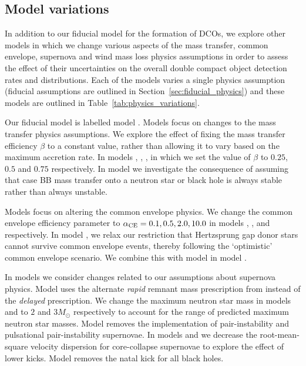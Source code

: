 \subsection{Model variations} \label{sec:variation_assumptions}
In addition to our fiducial model for the formation of DCOs, we explore \nMinusOneModels{} other models in which we change various aspects of the mass transfer, common envelope, supernova and wind mass loss physics assumptions in order to assess the effect of their uncertainties on the overall double compact object detection rates and distributions. Each of the models varies a single physics assumption (fiducial assumptions are outlined in Section~\ref{sec:fiducial_physics}) and these models are outlined in Table~\ref{tab:physics_variations}.

Our fiducial model is labelled model \modFid{}. Models \modRangeMT{} focus on changes to the mass transfer physics assumptions. We explore the effect of fixing the mass transfer efficiency $\beta$ to a constant value, rather than allowing it to vary based on the maximum accretion rate. In models \modBetaLow{}, \modBetaMed{}, \modBetaHigh{}, in which we set the value of $\beta$ to $0.25$, $0.5$ and $0.75$ respectively. In model \modCaseBB{} we investigate the consequence of assuming that case BB mass transfer onto a neutron star or black hole is always stable rather than always unstable.

Models \modRangeCE{} focus on altering the common envelope physics. We change the common envelope efficiency parameter to $\alpha_{\rm CE} = 0.1, 0.5, 2.0, 10.0$ in models \modAlphaLowest{}, \modAlphaLow{}, \modAlphaHigh{} and \modAlphaHighest{} respectively. In model \modOpt{}, we relax our restriction that Hertzsprung gap donor stars cannot survive common envelope events, thereby following the `optimistic' common envelope scenario. We combine this with model \modCaseBB{} in model \modCaseBBOpt{}.

In models \modRangeSN{} we consider changes related to our assumptions about supernova physics. Model \modRapid{} uses the alternate \textit{rapid} remnant mass prescription from \citet{Fryer+2012} instead of the \textit{delayed} prescription. We change the maximum neutron star mass in models \modNSLow{} and \modNSHigh{} to $2$ and $3 \unit{M_{\odot}}$ respectively to account for the range of predicted maximum neutron star masses. Model \modNoPISN{} removes the implementation of pair-instability and pulsational pair-instability supernovae. In models \modSigLow{} and \modSigLower{} we decrease the root-mean-square velocity dispersion for core-collapse supernovae to explore the effect of lower kicks. Model \modNoBH{} removes the natal kick for all black holes.


